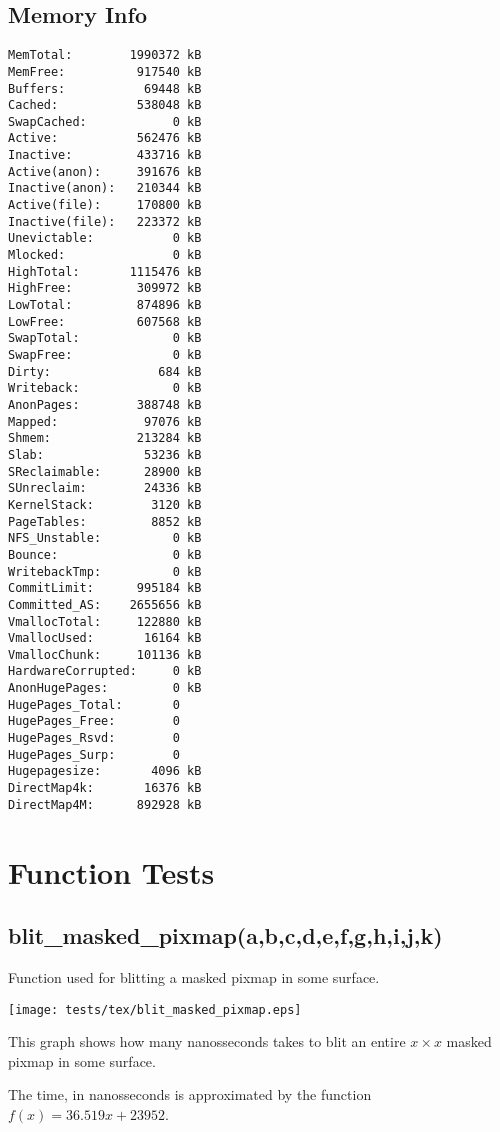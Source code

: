 \documentclass{article}
\begin{document}
\subsection{Memory Info}
\begin{verbatim}
MemTotal:        1990372 kB
MemFree:          917540 kB
Buffers:           69448 kB
Cached:           538048 kB
SwapCached:            0 kB
Active:           562476 kB
Inactive:         433716 kB
Active(anon):     391676 kB
Inactive(anon):   210344 kB
Active(file):     170800 kB
Inactive(file):   223372 kB
Unevictable:           0 kB
Mlocked:               0 kB
HighTotal:       1115476 kB
HighFree:         309972 kB
LowTotal:         874896 kB
LowFree:          607568 kB
SwapTotal:             0 kB
SwapFree:              0 kB
Dirty:               684 kB
Writeback:             0 kB
AnonPages:        388748 kB
Mapped:            97076 kB
Shmem:            213284 kB
Slab:              53236 kB
SReclaimable:      28900 kB
SUnreclaim:        24336 kB
KernelStack:        3120 kB
PageTables:         8852 kB
NFS_Unstable:          0 kB
Bounce:                0 kB
WritebackTmp:          0 kB
CommitLimit:      995184 kB
Committed_AS:    2655656 kB
VmallocTotal:     122880 kB
VmallocUsed:       16164 kB
VmallocChunk:     101136 kB
HardwareCorrupted:     0 kB
AnonHugePages:         0 kB
HugePages_Total:       0
HugePages_Free:        0
HugePages_Rsvd:        0
HugePages_Surp:        0
Hugepagesize:       4096 kB
DirectMap4k:       16376 kB
DirectMap4M:      892928 kB
\end{verbatim}
\section{Function Tests}
\subsection{blit\_masked\_pixmap(a,b,c,d,e,f,g,h,i,j,k)}
Function used for blitting a masked pixmap in some surface.

\texttt{[image: tests/tex/blit\_masked\_pixmap.eps]}

This graph shows how many nanosseconds takes to blit an entire $x \times x$ masked pixmap in some surface.

The time, in nanosseconds is 
approximated by the function $f(x)=36.519x+23952$.
\end{document}
